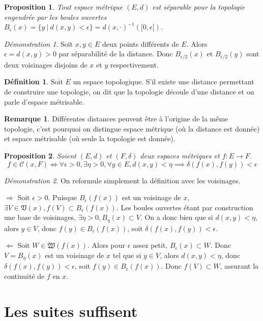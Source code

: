 \documentclass[a4paper, 11pt, french]{book}
\newenvironment{itemise}{\itemize}{\enditemize}
\theoremstyle{plain} %
\newtheorem{proposition}{Proposition}
\theoremstyle{definition} %
\newtheorem{definition}{Définition}
\newtheorem{remarque}{Remarque}
\theoremstyle{remark} %
\newtheorem*{demonstration}{Démonstration}
\newcommand{\1}{\mathds{1}}
\newcommand{\inv}[1]{#1^{-1}}
\renewcommand{\cal}[1]{\mathcal{#1}}
\renewcommand{\frak}[1]{\mathfrak{#1}}
\newcommand\ens[2]{\{#1 \ |\ #2\}}
\newcommand\equivalence[3]{
	\begin{demonstration}
		#1
		\begin{itemise}
			\item[$\Longrightarrow$] #2
			\item[$\Longleftarrow$] #3
		\end{itemise}
	\end{demonstration}
}
\begin{document}
\begin{proposition}
	Tout espace métrique $(E, d)$ est séparable pour la topologie engendrée par les boules ouvertes $B_\epsilon(x)=\ens{y}{d(x, y)<\epsilon}=\inv{d(x, \cdot)}([0, \epsilon[)$.
\end{proposition}

\begin{demonstration}
	Soit $x, y\in E$ deux points différents de $E$.
	Alors $\epsilon=d(x, y)>0$ par séparabilité de la distance.
	Donc $B_{\epsilon/2}(x)$ et $B_{\epsilon/2}(y)$ sont deux voisinages disjoins de $x$ et $y$ respectivement.
\end{demonstration}

\begin{definition}
	Soit $E$ un espace topologique.
	S’il existe une distance permettant de construire une topologie, on dit que la topologie découle d’une distance et on parle d’espace métrisable.
\end{definition}

\begin{remarque}
	Différentes distances peuvent être à l’origine de la même topologie, c’est pourquoi on distingue espace métrique (où la distance est donnée) et espace métrisable (où seule la topologie est donnée).
\end{remarque}

\begin{proposition}
	Soient $(E, d)$ et $(F, \delta)$ deux espaces métriques et $f\colon E\rightarrow F$.
	$$
	f\in\cal{C}(x, F)
	\iff
	\forall\epsilon>0, \exists\eta>0, \forall y\in E, d(x, y)<\eta\implies\delta(f(x), f(y))<\epsilon
	$$
\end{proposition}

\equivalence{
	On reformule simplement la définition avec les voisinages.
}{
	Soit $\epsilon>0$.
	Puisque $B_\epsilon(f(x))$ est un voisinage de $x$, $\exists V\in\frak{V}(x), f(V)\subset B_\epsilon(f(x))$.
	Les boules ouvertes étant par construction une base de voisinages, $\exists\eta>0, B_\eta(x)\subset V$.
	On a donc bien que si $d(x, y)<\eta$, alors $y\in V$, donc $f(y)\in B_\epsilon(f(x))$, soit $\delta(f(x), f(y))<\epsilon$.
}{
	 Soit $W\in\frak{W}(f(x))$.
	Alors pour $\epsilon$ assez petit, $B_\epsilon(x)\subset W$.
	Donc $V=B_\eta(x)$ est un voisinage de $x$ tel que si $y\in V$, alors $d(x, y)<\eta$, donc $\delta(f(x), f(y))<\epsilon$, soit $f(y)\in B_\epsilon(f(x))$.
	Donc $f(V)\subset W$, assurant la continuité de $f$ en $x$.	
}

\section{Les suites suffisent}
\end{document}

